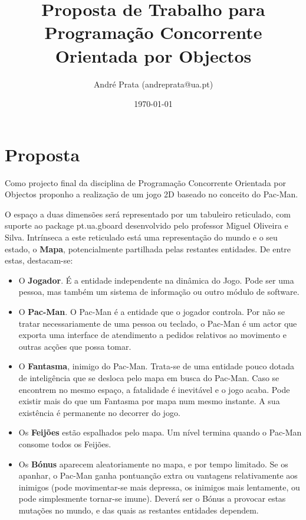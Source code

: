 \documentclass{article}
\begin{document}
\title{Proposta de Trabalho para Programação Concorrente Orientada por Objectos}
\author{André Prata (andreprata@ua.pt)}
\date{\today}

\maketitle

\section{Proposta}
Como projecto final da disciplina de Programação Concorrente Orientada por
Objectos proponho a realização de um jogo 2D baseado no conceito do Pac-Man.

O espaço a duas dimensões será representado por um tabuleiro reticulado, com
suporte ao package pt.ua.gboard desenvolvido pelo professor Miguel Oliveira e
Silva. Intrínseca a este reticulado está uma representação do mundo e o seu
estado, o \textbf{Mapa}, potencialmente partilhada pelas restantes entidades.
De entre estas, destacam-se:

\begin{itemize}
\item O \textbf{Jogador}. É a entidade independente na dinâmica do Jogo. Pode
ser uma pessoa, mas também um sistema de informação ou outro módulo de software.

\item O \textbf{Pac-Man}. O Pac-Man é a entidade que o jogador controla. Por não
se tratar necessariamente de uma pessoa ou teclado, o Pac-Man é um actor que
exporta uma interface de atendimento a pedidos relativos ao movimento e outras
acções que possa tomar.

\item O \textbf{Fantasma}, inimigo do Pac-Man. Trata-se de uma entidade pouco
dotada de inteligência que se desloca pelo mapa em busca do Pac-Man. Caso se
encontrem no mesmo espaço, a fatalidade é inevitável e o jogo acaba. Pode
existir mais do que um Fantasma por mapa num mesmo instante. A sua existência é
permanente no decorrer do jogo.

\item Os \textbf{Feijões} estão espalhados pelo mapa. Um nível termina quando o
Pac-Man consome todos os Feijões.

\item Os \textbf{Bónus} aparecem aleatoriamente no mapa, e por tempo limitado.
Se os apanhar, o Pac-Man ganha pontuanção extra ou vantagens relativamente aos
inimigos (pode movimentar-se mais depressa, os inimigos mais lentamente, ou
pode simplesmente tornar-se imune). Deverá ser o Bónus a provocar estas
mutações no mundo, e das quais as restantes entidades dependem.
\end{itemize}
\end{document}
